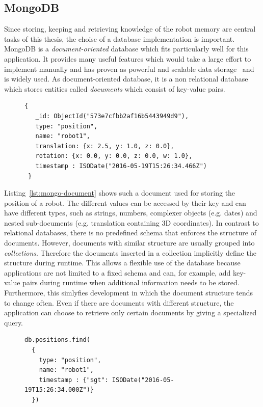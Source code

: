 \documentclass[a4paper,11pt]{article}
\newcommand{\reflst}[1]{Listing~\ref{#1}}
\begin{document}
\subsection{MongoDB}
\label{sec:mongodb}

Since storing, keeping and retrieving knowledge of the robot memory
are central tasks of this thesis, the choise of a database
implementation is important. MongoDB is a \emph{document-oriented}
database which fits particularly well for this application. It
provides many useful features which would take a large effort to
implement manually and has proven as powerful and scalable data
storage~\cite{mongodb,RoboDB} and is widely used. As document-oriented
database, it is a non relational database which stores entities called
\emph{documents} which consist of key-value pairs.
\begin{figure}
\begin{lstlisting}[style=SmallJSON,
  caption={MongoDB document representing the position of a robot},
  label=lst:mongo-document,
  framexleftmargin=15pt, xleftmargin=15pt,
 morekeywords={}]
 {
   _id: ObjectId("573e7cfbb2af16b5443949d9"),
   type: "position",
   name: "robot1",
   translation: {x: 2.5, y: 1.0, z: 0.0},
   rotation: {x: 0.0, y: 0.0, z: 0.0, w: 1.0},
   timestamp : ISODate("2016-05-19T15:26:34.466Z")
 }
\end{lstlisting}
\end{figure}
 \reflst{lst:mongo-document} shows such
a document used for storing the position of a robot. The different
values can be accessed by their key and can have different types, such
as strings, numbers, complexer objects (e.g. dates) and nested
sub-documents (e.g. translation containing 3D coordinates). In
contrast to relational databases, there is no predefined schema that
enforces the structure of documents. However, documents with similar
structure are usually grouped into \emph{collections}. Therefore the
documents inserted in a collection implicitly define the structure
during runtime. This allows a flexible use of the database because
applications are not limited to a fixed schema and can, for example,
add key-value pairs during runtime when additional information needs
to be stored. Furthermore, this simlyfies development in which the
document structure tends to change often. Even if there are documents
with different structure, the application can choose to retrieve only
certain documents by giving a specialized query.
\begin{figure}
\begin{lstlisting}[style=SmallJSON,
  caption={MongoDB query retrieving the document shown in \reflst{lst:mongo-document}},
  label=lst:mongo-query,
  framexleftmargin=15pt, xleftmargin=15pt,
 morekeywords={}]
db.positions.find(
  {
    type: "position",
    name: "robot1",
    timestamp : {"$gt": ISODate("2016-05-19T15:26:34.000Z")}
  })
\end{lstlisting}
\end{figure}
\end{document}
